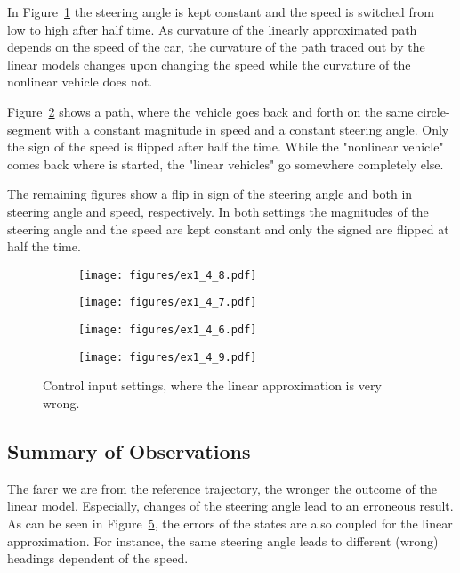 In Figure~\ref{fig:ex8} the steering angle is kept constant and the speed is switched from low to high after half time. 
As curvature of the linearly approximated path depends on the speed of the car, the curvature of the path traced out by the linear models changes upon changing the speed while the curvature of the nonlinear vehicle does not.

Figure~\ref{fig:ex7} shows a path, where the vehicle goes back and forth on the same circle-segment with a constant magnitude in speed and a constant steering angle.
Only the sign of the speed is flipped after half the time.
While the "nonlinear vehicle" comes back where is started, the "linear vehicles" go somewhere completely else.

The remaining figures show a flip in sign of the steering angle and both in steering angle and speed, respectively.
In both settings the magnitudes of the steering angle and the speed are kept constant and only the signed are flipped at half the time.

\begin{figure}[h]
	\centering
	\begin{subfigure}{0.49\textwidth}
		\texttt{[image: figures/ex1\_4\_8.pdf]}
		\label{fig:ex8}
	\end{subfigure}
	\begin{subfigure}{0.49\textwidth}
		\texttt{[image: figures/ex1\_4\_7.pdf]}
		\label{fig:ex7}
	\end{subfigure}
	\begin{subfigure}{0.49\textwidth}
		\texttt{[image: figures/ex1\_4\_6.pdf]}
		\label{fig:ex6}
	\end{subfigure}
	\begin{subfigure}{0.49\textwidth}
		\texttt{[image: figures/ex1\_4\_9.pdf]}
		\label{fig:ex9}
	\end{subfigure}
	\caption{Control input settings, where the linear approximation is very wrong.}
	\label{fig:ex6789}
\end{figure}

\subsection{Summary of Observations}
The farer we are from the reference trajectory, the wronger the outcome of the linear model. 
Especially, changes of the steering angle lead to an erroneous result.
As can be seen in Figure~\ref{fig:ex6789}, the errors of the states are also coupled for the linear approximation.
For instance, the same steering angle leads to different (wrong) headings dependent of the speed.